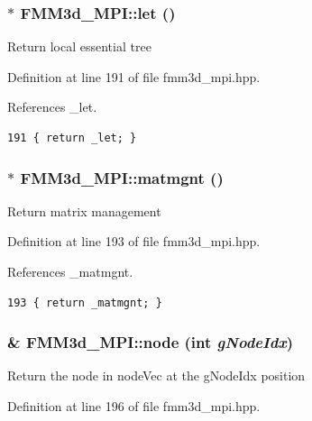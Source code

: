 \subsubsection{$\ast$ FMM3d\_\-MPI::let ()\hspace{0.3cm}{\tt  [inline]}}\label{classFMM3d__MPI_ab08876abdb0f42b280939bc45a41dad_ab08876abdb0f42b280939bc45a41dad}


Return local essential tree 

Definition at line 191 of file fmm3d\_\-mpi.hpp.

References \_\-let.

\footnotesize\begin{verbatim}191 { return _let; }
\end{verbatim}\normalsize 


\subsubsection{$\ast$ FMM3d\_\-MPI::matmgnt ()\hspace{0.3cm}{\tt  [inline]}}\label{classFMM3d__MPI_eb0e3260b02ea4bd6f7a2303874f53bf_eb0e3260b02ea4bd6f7a2303874f53bf}


Return matrix management 

Definition at line 193 of file fmm3d\_\-mpi.hpp.

References \_\-matmgnt.

\footnotesize\begin{verbatim}193 { return _matmgnt; }
\end{verbatim}\normalsize 


\subsubsection{\& FMM3d\_\-MPI::node (int {\em g\-Node\-Idx})\hspace{0.3cm}{\tt  [inline]}}\label{classFMM3d__MPI_f259ccf218dbf0a04530841785f1a8b0_f259ccf218dbf0a04530841785f1a8b0}


Return the node in node\-Vec at the g\-Node\-Idx position 

Definition at line 196 of file fmm3d\_\-mpi.hpp.

